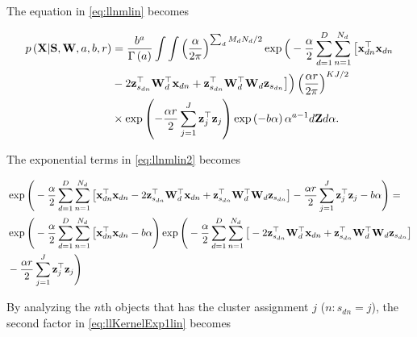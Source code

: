 	The equation in \eqref{eq:llnmlin} becomes
	
	\begin{align}
	p\left(\mathbf{X}|\mathbf{S},\mathbf{W},a,b,r\right) &= \frac{b^a}{\Gamma\left(a\right)}\int \int \left(\frac{\alpha}{2\pi}\right)^{\sum_d M_d N_d /2}\exp\Big(-\frac{\alpha}{2} \sum_{d=1}^{D}\sum_{n=1}^{N_d}\big[ \mathbf{x}_{dn}^\top \mathbf{x}_{dn}  \notag\\
	&  - 2 \mathbf{z}_{s_{dn}} ^\top \mathbf{W}_d^\top \mathbf{x}_{dn} + \mathbf{z}_{s_{dn}}^\top \mathbf{W}_d^\top \mathbf{W}_d \mathbf{z}_{s_{dn}} \big]\Big)\left(\frac{\alpha r}{2\pi}\right)^{KJ/2} \notag \\
	&\times \exp\left(-\frac{\alpha r}{2} \sum_{j=1}^{J}\mathbf{z}_j^\top\mathbf{z}_j\right)\exp\left(-b\alpha\right)\alpha^{a-1}d\boldsymbol{\mathrm{Z}} d\alpha.
	\label{eq:llnmlin2}
	\end{align}
	
	The exponential terms in \eqref{eq:llnmlin2} becomes
	
	\begin{align}
	&\exp\Bigg(-\frac{\alpha}{2} \sum_{d=1}^{D}\sum_{n=1}^{N_d}\big[ \mathbf{x}_{dn}^\top \mathbf{x}_{dn}-2 \mathbf{z}_{s_{dn}} ^\top \mathbf{W}_d^\top \mathbf{x}_{dn} + \mathbf{z}_{s_{dn}}^\top \mathbf{W}_d^\top \mathbf{W}_d \mathbf{z}_{s_{dn}}\big]-\frac{\alpha r}{2} \sum_{j=1}^{J}\mathbf{z}_j^\top\mathbf{z}_j -b\alpha\Bigg) = \notag\\
	& \exp\Bigg(-\frac{\alpha}{2} \sum_{d=1}^{D}\sum_{n=1}^{N_d}\big[ \mathbf{x}_{dn}^\top \mathbf{x}_{dn}-b\alpha\Bigg)\exp\Bigg(-\frac{\alpha}{2} \sum_{d=1}^{D}\sum_{n=1}^{N_d}\big[ -2 \mathbf{z}_{s_{dn}} ^\top \mathbf{W}_d^\top \mathbf{x}_{dn}+\mathbf{z}_{s_{dn}}^\top \mathbf{W}_d^\top \mathbf{W}_d \mathbf{z}_{s_{dn}}\big] \notag\\
	&-\frac{\alpha r}{2} \sum_{j=1}^{J}\mathbf{z}_j^\top\mathbf{z}_j\Bigg) \label{eq:llKernelExp1lin}
	\end{align}
	
	By analyzing the $n$th objects that has the cluster assignment $j$ ($n:s_{dn}=j$), the second factor in \eqref{eq:llKernelExp1lin} becomes
	
